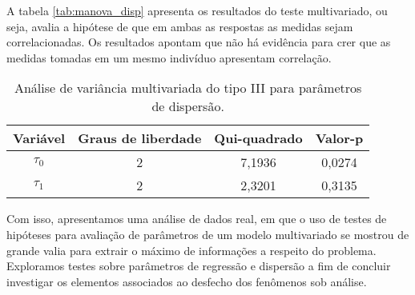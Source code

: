 A tabela \autoref{tab:manova_disp} apresenta os resultados do teste multivariado, ou seja, avalia a hipótese de que em ambas as respostas as medidas sejam correlacionadas. Os resultados apontam que não há evidência para crer que as medidas tomadas em um mesmo indivíduo apresentam correlação.

\begin{table}[H]
\centering
\begin{tabular}{cccc}
\hline
Variável               & Graus de liberdade & Qui-quadrado & Valor-p        \\ \hline
$\tau_0$ & 2                  & 7,1936       & 0,0274 \\
$\tau_1$ & 2                  & 2,3201       & 0,3135         \\ \hline
\end{tabular}
\caption{Análise de variância multivariada do tipo III para parâmetros de dispersão.}
\label{tab:manova_disp}
\end{table}


Com isso, apresentamos uma análise de dados real, em que o uso de testes de hipóteses para avaliação de parâmetros de um modelo multivariado se mostrou de grande valia para extrair o máximo de informações a respeito do problema. Exploramos testes sobre parâmetros de regressão e dispersão a fim de concluir investigar os elementos associados ao desfecho dos fenômenos sob análise.
